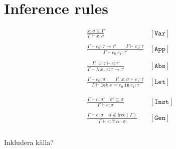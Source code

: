 \chapter{Inference rules}

\begin{center}
\begin{equation}
\begin{array}{cl}
 \displaystyle\frac{x:\sigma \in \Gamma}{\Gamma \vdash x:\sigma}&[\mathtt{Var}]\\ \\
 \displaystyle\frac{\Gamma \vdash e_0:\tau \rightarrow \tau' \quad\quad \Gamma \vdash e_1 : \tau }{\Gamma \vdash e_0\ e_1 : \tau'}&[\mathtt{App}]\\ \\
 \displaystyle\frac{\Gamma,\;x:\tau\vdash e:\tau'}{\Gamma \vdash \lambda\ x\ .\ e : \tau \rightarrow \tau'}&[\mathtt{Abs}]\\ \\
 \displaystyle\frac{\Gamma \vdash e_0:\sigma \quad\quad \Gamma,\,x:\sigma \vdash e_1:\tau}{\Gamma \vdash \mathtt{let}\ x = e_0\ \mathtt{in}\ e_1 : \tau} &[\mathtt{Let}]\\ \\ \\
 \displaystyle\frac{\Gamma \vdash e:\sigma' \quad \sigma' \sqsubseteq \sigma}{\Gamma \vdash e:\sigma}&[\mathtt{Inst}]\\ \\
 \displaystyle\frac{\Gamma \vdash e:\sigma \quad \alpha \notin \text{free}(\Gamma)}{\Gamma \vdash e:\forall\ \alpha\ .\ \sigma}&[\mathtt{Gen}]\\ \\
\end{array}
\end{equation}
\end{center}

Inkludera källa? %
